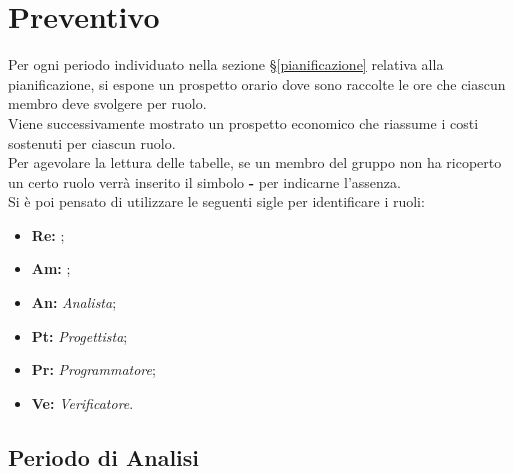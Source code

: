 \section{Preventivo}
\label{preventivo}
Per ogni periodo individuato nella sezione \S\ref{pianificazione} relativa alla pianificazione, si espone un prospetto orario dove sono raccolte le ore che ciascun membro deve svolgere per ruolo.\\Viene successivamente mostrato un prospetto economico che riassume i costi sostenuti per ciascun ruolo.\\
Per agevolare la lettura delle tabelle, se un membro del gruppo non ha ricoperto un certo ruolo verrà inserito il simbolo \textbf{-} per indicarne l'assenza.\\Si è poi pensato di utilizzare le seguenti sigle per identificare i ruoli:
\begin{itemize}
\item \textbf{Re:} \textit{\Responsabile};
\item \textbf{Am:} \textit{\Amministratore};
\item \textbf{An:} \textit{Analista};
\item \textbf{Pt:} \textit{Progettista};
\item \textbf{Pr:} \textit{Programmatore};
\item \textbf{Ve:} \textit{Verificatore}.
\end{itemize}
\newpage

\subsection{Periodo di Analisi}
